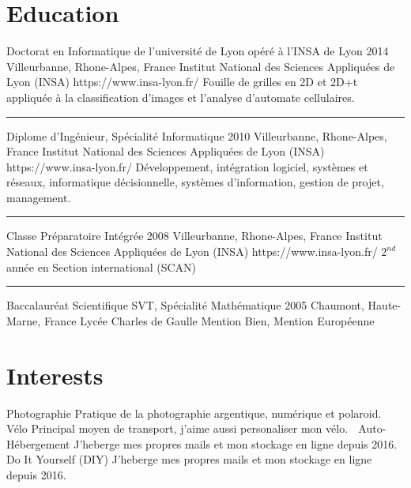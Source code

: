 \documentclass[singlesided,
  paper=a4,
  fontsize=10pt
]{resume}
\begin{document}
{  \section[\fa{graduation-cap}]{Education}
    \schooldiploma
      {Doctorat en Informatique de l'université de Lyon opéré à l'INSA de Lyon}
      {2014}
      {Villeurbanne, Rhone-Alpes, France}
      {Institut National des Sciences Appliquées de Lyon (INSA)}
      {https://www.insa-lyon.fr/}
      {
Fouille de grilles en 2D et 2D+t appliquée à la classification d'images et
l'analyse d'automate cellulaires.}
    \textcolor{lightgray}{\rule{\linewidth}{0.25pt}}
    \schooldiploma
      {Diplome d'Ingénieur, Spécialité Informatique}
      {2010}
      {Villeurbanne, Rhone-Alpes, France}
      {Institut National des Sciences Appliquées de Lyon (INSA)}
      {https://www.insa-lyon.fr/}
      {
Développement, intégration logiciel, systèmes et réseaux, informatique
décisionnelle, systèmes d'information, gestion de projet, management.}
    \textcolor{lightgray}{\rule{\linewidth}{0.25pt}}
    \schooldiploma
      {Classe Préparatoire Intégrée}
      {2008}
      {Villeurbanne, Rhone-Alpes, France}
      {Institut National des Sciences Appliquées de Lyon (INSA)}
      {https://www.insa-lyon.fr/}
      {
$2^{nd}$ année en Section international (SCAN)}
    \textcolor{lightgray}{\rule{\linewidth}{0.25pt}}
    \schooldiploma
      {Baccalauréat Scientifique SVT, Spécialité Mathématique}
      {2005}
      {Chaumont, Haute-Marne, France}
      {Lycée Charles de Gaulle}
      {}
      {
Mention Bien, Mention Européenne}
  \section[\nerdfont]{Interests}
  \interest%
    {Photographie}%
    {Pratique de la photographie argentique, numérique et polaroid.}
    {\nerdfont}
  \interest%
    {Vélo}%
    {Principal moyen de transport, j'aime aussi personaliser mon vélo.}
    {\nerdfont}
  \interest%
    {Auto-Hébergement}%
    {J'heberge mes propres mails et mon stockage en ligne depuis 2016.}
    {\nerdfont}
  \interest%
    {Do It Yourself (DIY)}%
    {J'heberge mes propres mails et mon stockage en ligne depuis 2016.}
    {\nerdfont}
}
\makebody
\end{document}

